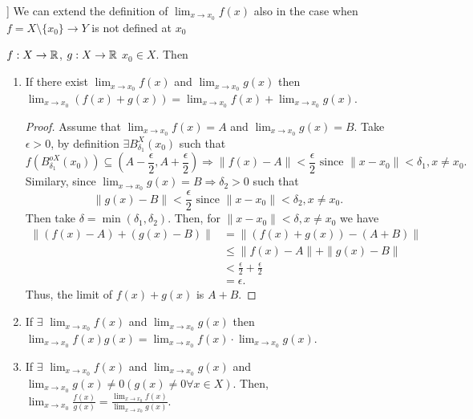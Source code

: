 \documentclass[a4paper]{article}
\begin{document}
\begin{corollary}]
  We can extend the definition of $\lim_{x \to x_0} f(x)$ also in the case when $f=X \setminus \{x_0\} \to Y $ is not defined at $x_0$ 
\end{corollary}

\begin{prop}
$f: X \to \mathbb{R}$, $g: X \to \mathbb{R}$ $x_0 \in X$. Then

  \begin{enumerate}
    \item If there exist $\lim_{x \to x_0} f(x)$ and $\lim_{x \to x_0} g(x)$ then $\lim_{x \to x_0} (f(x) + g(x)) = \lim_{x \to x_0} f(x) + \lim_{x \to x_0} g(x)$.

      \begin{proof}
        Assume that  $\lim_{x \to x_0} f(x) =A$ and $\lim_{x \to x_0} g(x) = B$. Take $\epsilon > 0$, by definition  $\exists B_{\delta_1}^{X} (x_0)$ such that 
        \[
        f\left( B_{\delta_1}^{o X} (x_0) \right) \subseteq \left( A - \frac{\epsilon}{2}, A + \frac{\epsilon}{2} \right) \Rightarrow \| f(x) - A \| < \frac{\epsilon}{2} \text{ since } \|x - x_0\| < \delta_1, x \neq x_0
        .\]
        Similary, since $\lim_{x \to x_0} g(x) = B \Rightarrow \delta_2 > 0$ such that 
        \[
        \| g(x) - B \| < \frac{\epsilon}{2} \text{ since } \| x - x_0\| < \delta_2, x \neq x_0
        .\]
        Then take $\delta = \min\left( \delta_1, \delta_2 \right) $. Then, for $\| x- x_0\| < \delta, x \neq x_0$ we have 
        \begin{align*}
          \|(f(x) - A) + (g(x) - B)\| &=  \| \left( f(x) + g(x) \right)  - (A + B) \|  \\
                                      &\leq \|f(x) - A\| + \|g(x) - B\| \\
                                      &< \frac{\epsilon}{2} + \frac{\epsilon}{2} \\ 
                                      &= \epsilon
        .\end{align*}
        Thus, the limit of $f(x) + g(x)$ is  $A+B$. 
      \end{proof}

    \item If $\exists $ $\lim_{x \to x_0} f(x) $ and $\lim_{x \to x_0} g(x)$ then $\lim_{x \to x_0} f(x)g(x) = \lim_{x \to x_0} f(x) \cdot \lim_{x \to x_0} g(x)$. 
    \item If $\exists $ $\lim_{x \to x_0} f(x) $ and $\lim_{x \to x_0} g(x)$ and $\lim_{x \to x_0} g(x) \neq 0 (g(x) \neq 0 \forall x \in X)$. Then,  $\lim_{x \to x_0} \frac{f(x)}{g(x)} = \frac{ \lim_{x \to x_0} f(x)} {\lim_{x \to x_0} g(x)}$.
  \end{enumerate}
\end{prop}
\end{document}

